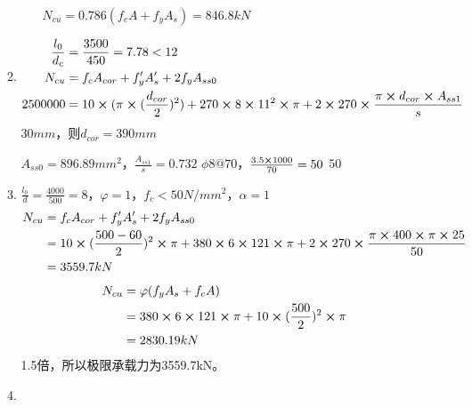 \documentclass{article}
\begin{document}
\begin{enumerate}
\begin{enumerate}[1.]
\begin{enumerate}
                              \par$N_{cu}=0.786(f_cA+f_yA_s)=846.8kN$
                    \end{enumerate}
              \item \begin{align*}
                        \frac{l_0}{d_c} & =\frac{3500}{450}=7.78<12                                                                                                         \\
                        N_{cu}          & =f_cA_{cor}+f_y^{\prime}A_s^{\prime}+2f_yA_{ss0}                                                                                  \\
                        2500000         & =10\cross(\pi\cross(\frac{d_{cor}}{2})^2)+270\cross8\cross11^2\cross\pi+2\cross270\cross\frac{\pi\cross d_{cor}\cross A_{ss1}}{s}
                    \end{align*}
                    $30mm$，则$d_{cor}=390mm$
                    \par$A_{ss0}=896.89mm^2$，$\frac{A_{ss1}}{s}=0.732$
                    $\phi8@70$，$\frac{3.5\cross1000}{70}=50$
                    $50$
              \item $\frac{l_0}{d}=\frac{4000}{500}=8$，$\varphi=1$，$f_c<50N/mm^2$，$\alpha=1$
                    \begin{align*}
                        N_{cu} & =f_cA_{cor}+f_y^{\prime}A_s^{\prime}+2f_yA_{ss0}                                                                             \\
                               & =10\cross(\frac{500-60}{2})^2\cross\pi+380\cross6\cross121\cross\pi+2\cross270\cross\frac{\pi\cross400\cross\pi\cross25}{50} \\
                               & =3559.7kN
                    \end{align*}
                    \begin{align*}
                        N_{cu} & =\varphi(f_yA_s+f_cA)                                            \\
                               & =380\cross6\cross121\cross\pi+10\cross(\frac{500}{2})^2\cross\pi \\
                               & =2830.19kN
                    \end{align*}
                    1.5倍，所以极限承载力为3559.7kN。
              \item \begin{align*}

\end{align*}
\end{enumerate}
\end{enumerate}
\end{document}
